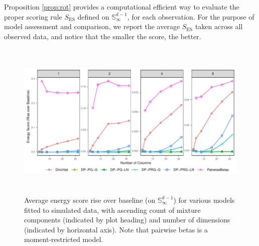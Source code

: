 \documentclass[iicol,sn-basic]{sn-jnl}
\theoremstyle{thmstyleone}
\begin{document}
Proposition \ref{prop:rot} provides a computational efficient way to evaluate the proper scoring rule $S_{\text{ES}}$ defined on ${\mathbb S}_\infty^{d-1}$, for each observation. For the purpose of model assessment and comparison, we report the average $S_{\text{ES}}$ taken across all observed data, and notice that the smaller the score, the better.

\begin{figure}[htb]
\centering
\caption{Average energy score rise over baseline (on $\mathbb{S}_{\infty}^{d-1}$) for various
models fitted to simulated data, with ascending count of mixture components (indicated by plot
heading) and number of dimensions (indicated by horizontal axis).  Note that pairwise betas is
a moment-restricted model.\label{fig:simpples}}
\includegraphics[height=3in, width = \textwidth]{./images/sim_es_rise}
\end{figure}
\end{document}
